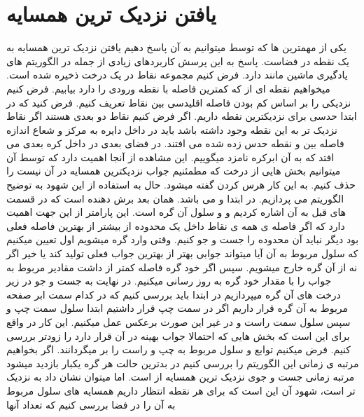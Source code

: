 \documentclass[11pt]{article}
\begin{document}
\section{یافتن نزدیک ترین همسایه}
یکی از مهمترین 
ها که توسط 
میتوانیم به آن پاسخ دهیم یافتن نزدیک ترین همسایه به یک نقطه در فضاست. پاسخ به این پرسش کاربردهای زیادی از جمله در الگوریتم های یادگیری ماشین مانند
 
دارد.
فرض کنیم مجموعه نقاط 
در یک درخت 
ذخیره شده است. 
میخواهیم نقطه ای از 
که کمترین فاصله با نقطه ورودی 
را دارد بیابیم.
فرض کنیم نزدیکی را بر اساس کم بودن فاصله اقلیدسی بین نقاط تعریف کنیم.
فرض کنید که در ابتدا حدسی برای نزدیکترین نقطه 
داریم. 
اگر فرض کنیم نقاط دو بعدی هستند
 اگر نقاط نزدیک تر به این نقطه وجود داشته باشد باید در داخل دایره به مرکز 
و شعاع اندازه فاصله بین   
و نقطه حدس زده شده 
می افتند.
در فضای 
بعدی در داخل کره 
بعدی می افتد که به آن ابرکره نامزد
میگوییم.
این مشاهده از آنجا اهمیت دارد که توسط آن
میتوانیم
بخش هایی از درخت که مطمئنیم جواب نزدیکترین همسایه در آن نیست را حذف کنیم.
به این کار هرس کردن 
گفته میشود. 
حال به استفاده از این شهود به توضیح الگوریتم 
می پردازیم.
در ابتدا
و 
می باشد. 
همان بعد برش دهنده است که در قسمت های قبل به آن اشاره کردیم و 
و 
سلول آن گره است. این پارامتر از این جهت اهمیت دارد که اگر فاصله ی همه ی نقاط داخل یک محدوده از 
بیشتر از بهترین فاصله فعلی بود دیگر نباید آن محدوده را جست و جو کنیم. 
وقتی وارد گره 
میشویم اول تعیین میکنیم که سلول مربوط به آن آیا میتواند جوابی بهتر از بهترین جواب فعلی تولید کند یا خیر اگر نه از آن گره خارج میشویم. سپس اگر خود گره فاصله کمتر از 
داشت مقادیر مربوط به جواب را با مقدار خود گره به روز رسانی میکنیم. در نهایت به جست و جو در زیر درخت های آن گره میپردازیم در ابتدا باید بررسی کنیم که در کدام سمت ابر صفحه مربوط به آن گره قرار داریم اگر در سمت چپ قرار داشتیم ابتدا سلول سمت چپ و سپس سلول سمت راست و در غیر این صورت برعکس عمل میکنیم. این کار در واقع برای این است که بخش هایی که احتمالا جواب بهینه در آن قرار دارد را زودتر بررسی کنیم. 
فرض میکنیم توابع 
و 
سلول مربوط به چپ و راست را بر میگردانند. 
اگر بخواهیم مرتبه ی زمانی این الگوریتم را بررسی کنیم در بدترین حالت هر گره یکبار بازدید میشود مرتبه زمانی جست و جوی نزدیک ترین همسایه از 
است. 
اما میتوان نشان داد به
نزدیک تر است، شهود آن این است که برای هر نقطه انتظار داریم همسایه های سلول مربوط به آن را در فضا بررسی کنیم که تعداد آنها 
\end{document}
